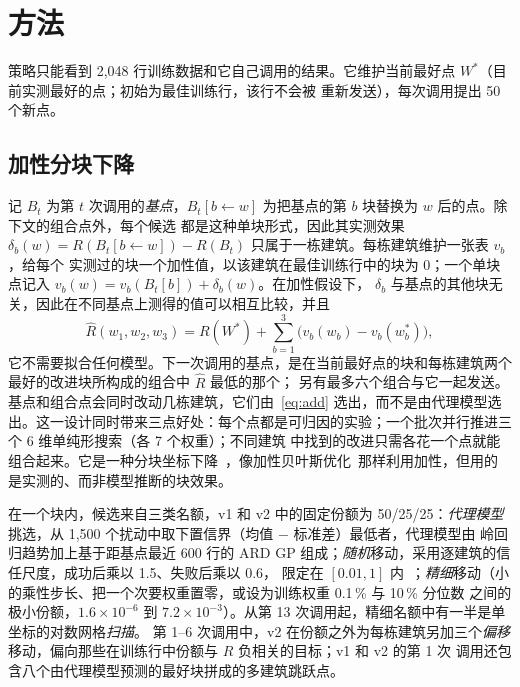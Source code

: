 \section{方法}
\label{sec:method}
策略只能看到 2,048 行训练数据和它自己调用的结果。它维护当前最好点 $W^\ast$（目前实测最好的点；初始为最佳训练行，该行不会被
重新发送），每次调用提出 50 个新点。

\subsection{加性分块下降}
\label{sec:block}
记 $B_t$ 为第 $t$ 次调用的\emph{基点}，$B_t[b\!\leftarrow\!w]$ 为把基点的第 $b$ 块替换为 $w$ 后的点。除下文的组合点外，每个候选
都是这种单块形式，因此其实测效果 $\delta_b(w)=R(B_t[b\!\leftarrow\!w])-R(B_t)$ 只属于一栋建筑。每栋建筑维护一张表 $v_b$，给每个
实测过的块一个加性值，以该建筑在最佳训练行中的块为 $0$；一个单块点记入 $v_b(w)=v_b(B_t[b])+\delta_b(w)$。在加性假设下，
$\delta_b$ 与基点的其他块无关，因此在不同基点上测得的值可以相互比较，并且
\begin{equation}
\hat R(w_1,w_2,w_3)=R(W^\ast)+\textstyle\sum_{b=1}^{3}\bigl(v_b(w_b)-v_b(w^\ast_b)\bigr),
\label{eq:add}
\end{equation}
它不需要拟合任何模型。下一次调用的基点，是在当前最好点的块和每栋建筑两个最好的改进块所构成的组合中 $\hat R$ 最低的那个；
另有最多六个组合与它一起发送。基点和组合点会同时改动几栋建筑，它们由~\eqref{eq:add} 选出，而不是由代理模型选出。这一设计同时带来三点好处：每个点都是可归因的实验；一个批次并行推进三个 6 维单纯形搜索（各 7 个权重）；不同建筑
中找到的改进只需各花一个点就能组合起来。它是一种分块坐标下降~\cite{bcd}，像加性贝叶斯优化~\cite{addgp}那样利用加性，但用的
是实测的、而非模型推断的块效果。

在一个块内，候选来自三类名额，v1 和 v2 中的固定份额为 50/25/25：\emph{代理模型}挑选，从 1,500 个扰动中取下置信界（均值 $-$ 标准差）最低者，代理模型由
岭回归趋势加上基于距基点最近 600 行的 ARD GP 组成；\emph{随机}移动，采用逐建筑的信任尺度，成功后乘以 1.5、失败后乘以 0.6，
限定在 $[0.01,1]$ 内~\cite{turbo}；\emph{精细}移动（小的乘性步长、把一个次要权重置零，或设为训练权重 0.1\,\% 与 10\,\% 分位数
之间的极小份额，$1.6\times10^{-6}$ 到 $7.2\times10^{-3}$）。从第 13 次调用起，精细名额中有一半是单坐标的对数网格\emph{扫描}。
第 1--6 次调用中，v2 在份额之外为每栋建筑另加三个\emph{偏移}移动，偏向那些在训练行中份额与 $R$ 负相关的目标；v1 和 v2 的第 1 次
调用还包含八个由代理模型预测的最好块拼成的多建筑跳跃点。

